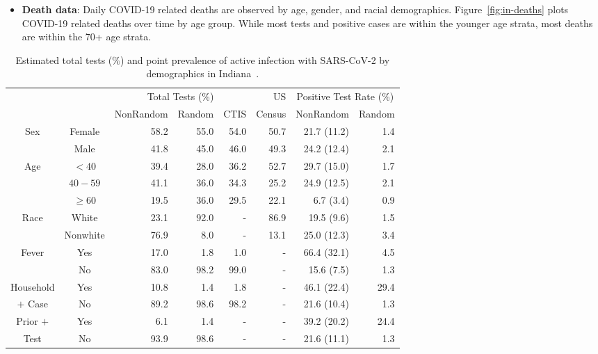 \documentclass[11pt]{amsart}
\numberwithin{equation}{section}
\theoremstyle{plain}
\begin{document}
\begin{itemize}[leftmargin=*]
 \item {\bf Death data}: Daily COVID-19 related deaths are observed by age, gender, and racial demographics.  Figure~\ref{fig:in-deaths} plots COVID-19 related deaths over time by age group. While most tests and positive cases are within the younger age strata, most deaths are within the 70+ age strata.
 \end{itemize}

 \begin{table}[th]
 \begin{tabular}{c | c | r r r | r | r r }
 & & \multicolumn{3}{c}{Total Tests (\%)} & US & \multicolumn{2}{c}{Positive Test Rate (\%)}\\
 \cline{3-5} \cline{7-8}
 & & NonRandom & Random & CTIS & Census & NonRandom & Random \\ \hline
 \multirow{2}{*}{Sex} & Female & 58.2 & 55.0 & 54.0 & 50.7 & 21.7 (11.2) & 1.4 \\
 & Male & 41.8 & 45.0  & 46.0 & 49.3 & 24.2 (12.4) & 2.1 \\ \hline
 \multirow{3}{*}{Age} & $<40$ & 39.4 & 28.0  & 36.2 & 52.7
 & 29.7 (15.0) & 1.7 \\
 & $40-59$ & 41.1 & 36.0  & 34.3 & 25.2 & 24.9 (12.5) & 2.1 \\
 & $\geq 60$ & 19.5 & 36.0  & 29.5 & 22.1 & 6.7 (3.4) & 0.9 \\ \hline
 \multirow{2}{*}{Race} & White & 23.1 & 92.0  & - & 86.9 & 19.5 (9.6) & 1.5 \\
 & Nonwhite & 76.9 & 8.0  & - & 13.1 & 25.0 (12.3) & 3.4 \\ \hline
 \multirow{2}{*}{Fever} & Yes & 17.0 & 1.8  & 1.0 & - & 66.4 (32.1) & 4.5 \\
 & No & 83.0 & 98.2  & 99.0 & - & 15.6 (7.5) & 1.3 \\ \hline
 Household & Yes & 10.8 & 1.4  & 1.8 & - & 46.1 (22.4) & 29.4 \\
 $+$ Case & No & 89.2 & 98.6  & 98.2 & - & 21.6 (10.4) & 1.3 \\ \hline
 Prior $+$ & Yes & 6.1 & 1.4  & - & - & 39.2 (20.2) & 24.4 \\
 Test & No & 93.9 & 98.6  & - & - & 21.6 (11.1) & 1.3 \\ \hline
 \end{tabular}
 \caption{Estimated total tests ($\%$) and point prevalence of active infection with SARS-CoV-2 by demographics in Indiana~\citep{Yiannoutsos2021}.}
 \label{tab:indiana}
 \end{table}
\end{document}
